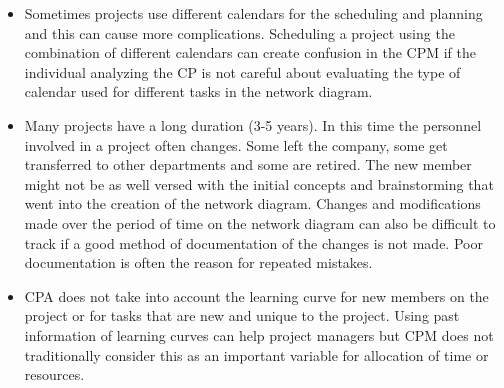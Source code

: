 \begin{itemize}
\item Sometimes projects use different calendars for the scheduling and planning and this can cause more
complications. Scheduling a project using the combination of different calendars can create
confusion in the CPM if the individual analyzing the CP is not careful about evaluating the type of
calendar used for different tasks in the network diagram.

\item Many projects have a long duration (3-5 years). In this time the personnel involved in a project
often changes. Some left the company, some get transferred to other departments and some are
retired. The new member might not be as well versed with the initial concepts and brainstorming that
went into the creation of the network diagram. Changes and modifications made over the period of
time on the network diagram can also be difficult to track if a good method of documentation of the
changes is not made. Poor documentation is often the reason for repeated mistakes.

\item CPA does not take into account the learning curve for new members on the project or for tasks that
are new and unique to the project. Using past information of learning curves can help project
managers but CPM does not traditionally consider this as an important variable for allocation of
time or resources. 
\end{itemize}
